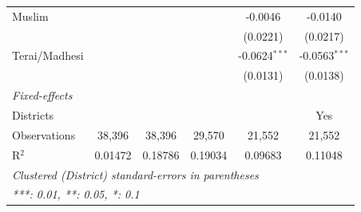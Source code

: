 \begin{tabular}{lccccc}
   Muslim                     &                &                         &                         & -0.0046                 & -0.0140\\   
                                               &                &                         &                         & (0.0221)                & (0.0217)\\   
   Terai/Madhesi              &                &                         &                         & -0.0624$^{***}$         & -0.0563$^{***}$\\   
                                               &                &                         &                         & (0.0131)                & (0.0138)\\   
   \midrule
   \emph{Fixed-effects}\\
   Districts                                        &                &                         &                         &                         & Yes\\  
   \midrule
   Observations                                & 38,396         & 38,396                  & 29,570                  & 21,552                  & 21,552\\  
   R$^2$                                       & 0.01472        & 0.18786                 & 0.19034                 & 0.09683                 & 0.11048\\  
   \midrule \midrule
   \multicolumn{6}{l}{\emph{Clustered (District) standard-errors in parentheses}}\\
   \multicolumn{6}{l}{\emph{***: 0.01, **: 0.05, *: 0.1}}\\
\end{tabular}
\par\endgroup
